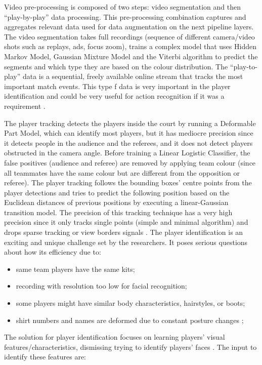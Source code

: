 \documentclass[
11pt,
twoside
]{report}
\begin{document}
Video pre-processing is composed of two steps: video segmentation and then ``play-by-play'' data processing. This pre-processing combination captures and aggregates relevant data used for data augmentation on the next pipeline layers. The video segmentation takes full recordings (sequence of different camera/video shots such as replays, ads, focus zoom), trains a complex model that uses Hidden Markov Model, Gaussian Mixture Model and the Viterbi algorithm to predict the segments and which type they are based on the colour distribution. The ``play-to-play'' data is a sequential, freely available online stream that tracks the most important match events. This type f data is very important in the player identification and could be very useful for action recognition if it was a requirement \cite{learn_track_id}.

The player tracking detects the players inside the court by running a Deformable Part Model, which can identify most players, but it has mediocre precision since it detects people in the audience and the referees, and it does not detect players obstructed in the camera angle. Before training a Linear Logistic Classifier, the false positives (audience and referee) are removed by applying team colour (since all teammates have the same colour but are different from the opposition or referee). The player tracking follows the bounding boxes' centre points from the player detections and tries to predict the following position based on the Euclidean distances of previous positions by executing a linear-Gaussian transition model. The precision of this tracking technique has a very high precision since it only tracks single points (simple and minimal algorithm) and drops sparse tracking or view borders signals \cite{learn_track_id}.
The player identification is an exciting and unique challenge set by the researchers. It poses serious questions about how its efficiency due to:

\begin{itemize}
\item same team players have the same kits;
\item recording with resolution too low for facial recognition;
\item some players might have similar body characteristics, hairstyles, or boots;
\item shirt numbers and names are deformed due to constant posture changes \cite{learn_track_id};
\end{itemize}


The solution for player identification focuses on learning players' visual features/characteristics, dismissing trying to identify players' faces \cite{learn_track_id}. The input to identify these features are:
\end{document}
